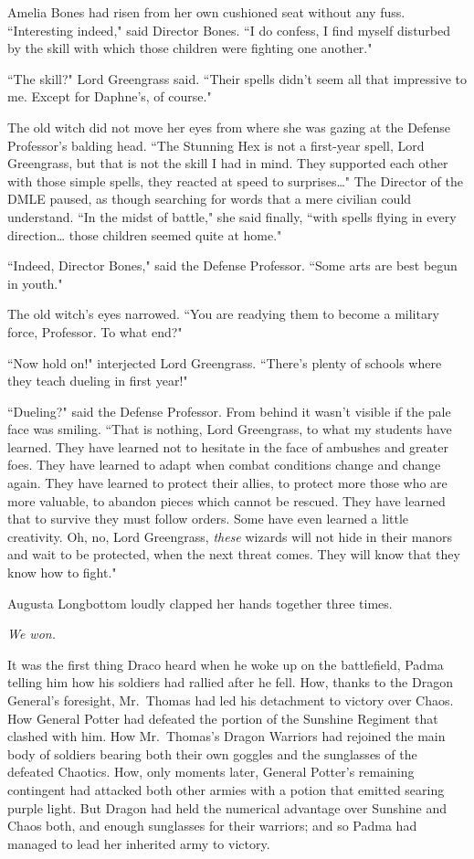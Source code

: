 Amelia Bones had risen from her own cushioned seat without any fuss. ``Interesting indeed," said Director Bones. ``I do confess, I find myself disturbed by the skill with which those children were fighting one another."

``The skill?" Lord Greengrass said. ``Their spells didn't seem all that impressive to me. Except for Daphne's, of course."

The old witch did not move her eyes from where she was gazing at the Defense Professor's balding head. ``The Stunning Hex is not a first-year spell, Lord Greengrass, but that is not the skill I had in mind. They supported each other with those simple spells, they reacted at speed to surprises{\ldots}" The Director of the DMLE paused, as though searching for words that a mere civilian could understand. ``In the midst of battle," she said finally, ``with spells flying in every direction{\ldots} those children seemed quite at home."

``Indeed, Director Bones," said the Defense Professor. ``Some arts are best begun in youth."

The old witch's eyes narrowed. ``You are readying them to become a military force, Professor. To what end?"

``Now hold on!" interjected Lord Greengrass. ``There's plenty of schools where they teach dueling in first year!"

``Dueling?" said the Defense Professor. From behind it wasn't visible if the pale face was smiling. ``That is nothing, Lord Greengrass, to what my students have learned. They have learned not to hesitate in the face of ambushes and greater foes. They have learned to adapt when combat conditions change and change again. They have learned to protect their allies, to protect more those who are more valuable, to abandon pieces which cannot be rescued. They have learned that to survive they must follow orders. Some have even learned a little creativity. Oh, no, Lord Greengrass, \emph{these} wizards will not hide in their manors and wait to be protected, when the next threat comes. They will know that they know how to fight."

Augusta Longbottom loudly clapped her hands together three times.

\later

\emph{We won.}

It was the first thing Draco heard when he woke up on the battlefield, Padma telling him how his soldiers had rallied after he fell. How, thanks to the Dragon General's foresight, Mr.~Thomas had led his detachment to victory over Chaos. How General Potter had defeated the portion of the Sunshine Regiment that clashed with him. How Mr.~Thomas's Dragon Warriors had rejoined the main body of soldiers bearing both their own goggles and the sunglasses of the defeated Chaotics. How, only moments later, General Potter's remaining contingent had attacked both other armies with a potion that emitted searing purple light. But Dragon had held the numerical advantage over Sunshine and Chaos both, and enough sunglasses for their warriors; and so Padma had managed to lead her inherited army to victory.

